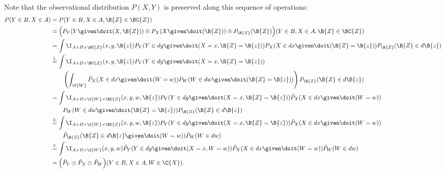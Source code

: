 Note that the observational distribution $P(X,Y)$ is preserved along this sequence of operations:
\begin{align*}
  P(Y \in B, X \in A)
  &= P(Y \in B, X \in A, \B{Z} \in \BC{Z}) \\
  &= \Big(P_Y(Y \given \doit(X,\B{Z})) \otimes P_X(X \given \doit(\B{Z})) \otimes P_{\B{Z}}(\B{Z})\Big)(Y \in B, X \in A, \B{Z} \in \BC{Z}) \\
  &= \int \I_{A\times B \times \BC{Z}}(x,y,\B{z}) P_Y(Y \in dy \given \doit(X=x,\B{Z}=\B{z})) P_X(X \in dx \given \doit(\B{Z}=\B{z})) P_{\B{Z}}(\B{Z} \in d\B{z}) \\
  &\stackrel{1.}{=} \int \I_{A\times B \times \BC{Z}}(x,y,\B{z}) P_Y(Y \in dy \given \doit(X=x,\B{Z}=\B{z})) \\
   & \qquad \left( \int_{\C{W}} \tilde{P}_X(X \in dx \given \doit(W=w)) P_W(W \in dw \given \doit(\B{Z}=\B{z})) \right) P_{\B{Z}}(\B{Z} \in d\B{z}) \\
  &= \int \I_{A\times B \times \C{W} \times \BC{Z}}(x,y,w,\B{z}) P_Y(Y \in dy \given \doit(X=x,\B{Z}=\B{z})) \tilde{P}_X(X \in dx \given \doit(W=w)) \\
   & \qquad P_W(W \in dw \given \doit(\B{Z}=\B{z})) P_{\B{Z}}(\B{Z} \in d\B{z}) \\
  &\stackrel{2.}{=} \int \I_{A\times B \times \C{W} \times \BC{Z}}(x,y,w,\B{z}) P_Y(Y \in dy \given \doit(X=x,\B{Z}=\B{z})) \tilde{P}_X(X \in dx \given \doit(W=w)) \\
   & \qquad \tilde{P}_{\B{Z}}(\B{Z} \in d\B{z} \given \doit(W=w)) \tilde{P}_W(W \in dw) \\
  &\stackrel{3.}{=} \int \I_{A\times B \times \C{W}}(x,y,w) \tilde{P}_Y(Y \in dy \given \doit(X=x,W=w)) \tilde{P}_X(X \in dx \given \doit(W=w)) \tilde{P}_W(W \in dw) \\
  &= \Big(\tilde{P}_Y \otimes \tilde{P}_X \otimes \tilde{P}_W\Big)(Y \in B, X \in A, W \in \C{X}).
\end{align*}


